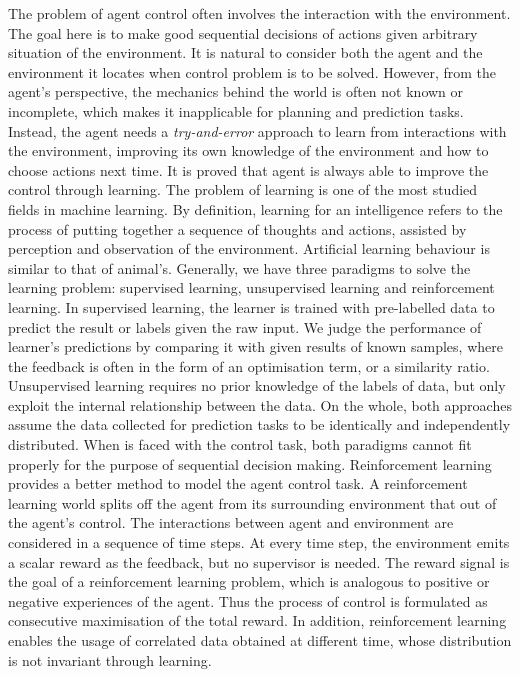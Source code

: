 \documentclass[oneside,11pt,a4paper]{article}
\begin{document}
The problem of agent control often involves the interaction with the environment. The goal here is to make good sequential decisions of actions given arbitrary situation of the environment. It is natural to consider both the agent and the environment it locates when control problem is to be solved. However, from the agent's perspective, the mechanics behind the world is often not known or incomplete, which makes it inapplicable for planning and prediction tasks. Instead, the agent needs a \textit{try-and-error} approach to learn from interactions with the environment, improving its own knowledge of the environment and how to choose actions next time. It is proved that agent is always able to improve the control through learning.
\newline
\newline
\noindent
The problem of learning is one of the most studied fields in machine learning. By definition, learning for an intelligence refers to the process of putting together a sequence of thoughts and actions, assisted by perception and observation of the environment. Artificial learning behaviour is similar to that of animal's. Generally, we have three paradigms to solve the learning problem: supervised learning, unsupervised learning and reinforcement learning. In supervised learning, the learner is trained with pre-labelled data to predict the result or labels given the raw input. We judge the performance of learner's predictions by comparing it with given results of known samples, where the feedback is often in the form of an optimisation term, or a similarity ratio. Unsupervised learning requires no prior knowledge of the labels of data, but only exploit the internal relationship between the data. On the whole, both approaches assume the data collected for prediction tasks to be identically and independently distributed. When is faced with the control task, both paradigms cannot fit properly for the purpose of sequential decision making.
\newline
\newline
\noindent
Reinforcement learning provides a better method to model the agent control task. A reinforcement learning world splits off the agent from its surrounding environment that out of the agent's control. The interactions between agent and environment are considered in a sequence of time steps. At every time step, the environment emits a scalar reward as the feedback, but no supervisor is needed. The reward signal is the goal of a reinforcement learning problem, which is analogous to positive or negative experiences of the agent. Thus the process of control is formulated as consecutive maximisation of the total reward. In addition, reinforcement learning enables the usage of correlated data obtained at different time, whose distribution is not invariant through learning.
\end{document}
